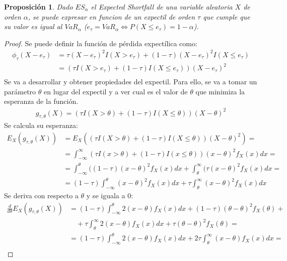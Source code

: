 \documentclass[11pt]{book}
\theoremstyle{plain} %
\newtheorem{proposition}{Proposición}
\theoremstyle{definition} %
\begin{document}
\begin{proposition}
   Dado $ES_\alpha$ el Expected Shortfall de una variable aleatoria $X$ de orden 
   $\alpha$, se puede expresar en funcion de un expectil de orden $\tau$ que 
   cumple que su valor es igual al $VaR_{\alpha}$
   ($e_\tau = VaR_{\alpha} \Longleftrightarrow P(X \leq e_\tau) =1-\alpha$).
   
\end{proposition}
\begin{proof}
   Se puede definir la función de pérdida expectílica como: 
   \begin{align*}
       \phi_{\tau}(X - e_\tau) &= \tau(X - e_\tau)^2 I(X > e_\tau) + (1 - \tau)(X - e_\tau)^2 I(X \leq e_\tau) \\
        &= (\tau I(X > e_\tau) + (1 - \tau)I(X \leq e_\tau))(X - e_\tau)^2 \\
   \end{align*}
   Se va a desarrollar y obtener propiedades del expectil. Para ello, 
   se va a tomar un parámetro $\theta$ en lugar del expectil y a ver cual es  el 
   valor de $\theta$ que minimiza la esperanza de la función.
   \begin{align*}
      g_{\tau, \theta}(X) = (\tau I(X > \theta) + (1 - \tau)I(X \leq \theta))(X - \theta)^2 
   \end{align*}
   Se calcula su esperanza:
   \begin{align*}
      E_{X}(g_{\tau, \theta}(X)) &= E_{X}((\tau I(X > \theta) + (1 - \tau)I(X \leq \theta))(X - \theta)^2) = \\
      &= \int_{-\infty}^{\infty}(\tau I(x > \theta) + (1 - \tau)I(x \leq \theta))(x - \theta)^2 f_X(x)dx = \\
      &= \int_{-\infty}^{\theta}((1 - \tau)(x - \theta)^2 f_X(x)dx + \int_{\theta}^{\infty}(\tau (x - \theta)^2 f_X(x)dx = \\
      &= (1 - \tau)\int_{-\infty}^{\theta}(x - \theta)^2 f_X(x)dx + \tau \int_{\theta}^{\infty}(x - \theta)^2 f_X(x)dx
   \end{align*}
   Se deriva con respecto a $\theta$ y se iguala a $0$:
   \begin{align*}
      \frac{d}{d\theta}E_{X}(g_{\tau, \theta}(X)) &= (1 - \tau)\int_{-\infty}^{\theta}2(x - \theta)f_X(x)dx + (1 - \tau)(\theta - \theta)^2 f_X(\theta) + \\
      &\quad + \tau\int_{\theta}^{\infty}2(x - \theta)f_X(x)dx + \tau(\theta - \theta)^2 f_X(\theta) = \\
      &= (1 - \tau)\int_{-\infty}^{\theta}2(x - \theta)f_X(x)dx + 2\tau\int_{\theta}^{\infty}(x - \theta)f_X(x)dx = \\

\end{align*}
\end{proof}
\end{document}
